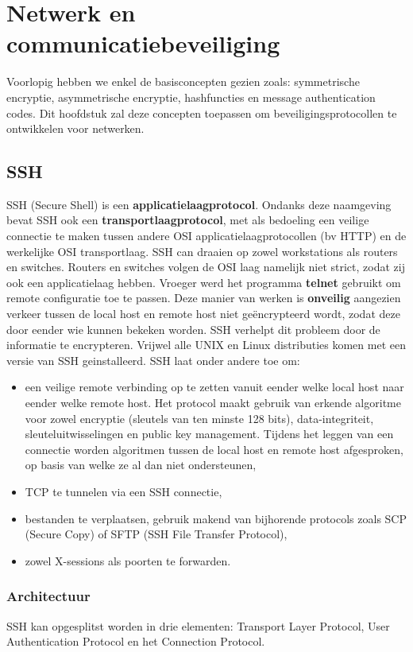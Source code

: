 \documentclass{report}
\begin{document}
	\chapter{Netwerk en communicatiebeveiliging}
	Voorlopig hebben we enkel de basisconcepten gezien zoals: symmetrische encryptie, asymmetrische encryptie, hashfuncties en message authentication codes. Dit hoofdstuk zal deze concepten toepassen om beveiligingsprotocollen te ontwikkelen voor netwerken.
	\section{SSH}
	SSH (Secure Shell) is een \textbf{applicatielaagprotocol}. Ondanks deze naamgeving bevat SSH ook een \textbf{transportlaagprotocol}, met als bedoeling een veilige connectie te maken tussen andere OSI applicatielaagprotocollen (bv HTTP) en de werkelijke OSI transportlaag. SSH can draaien op zowel workstations als routers en switches. Routers en switches volgen de OSI laag namelijk niet strict, zodat zij ook een applicatielaag hebben. Vroeger werd het programma \textbf{telnet} gebruikt om remote configuratie toe te passen. Deze manier van werken is \textbf{onveilig} aangezien verkeer tussen de local host en remote host niet geëncrypteerd wordt, zodat deze door eender wie kunnen bekeken worden. SSH verhelpt dit probleem door de informatie te encrypteren. Vrijwel alle UNIX en Linux distributies komen met een versie van SSH geinstalleerd. SSH laat onder andere toe om:
	\begin{itemize}
		\item een veilige remote verbinding op te zetten vanuit eender welke local host naar eender welke remote host. Het protocol maakt gebruik van erkende algoritme voor zowel encryptie (sleutels van ten minste 128 bits), data-integriteit, sleuteluitwisselingen en public key management. Tijdens het leggen van een connectie worden algoritmen tussen de local host en remote host afgesproken, op basis van welke ze al dan niet ondersteunen,
		\item TCP te tunnelen via een SSH connectie,
		\item bestanden te verplaatsen, gebruik makend van bijhorende protocols zoals SCP (Secure Copy) of SFTP (SSH File Transfer Protocol),
		\item zowel X-sessions als poorten te forwarden.
	\end{itemize}
	\subsection{Architectuur}
	SSH kan opgesplitst worden in drie elementen: Transport Layer Protocol, User Authentication Protocol en het Connection Protocol.
\end{document}

